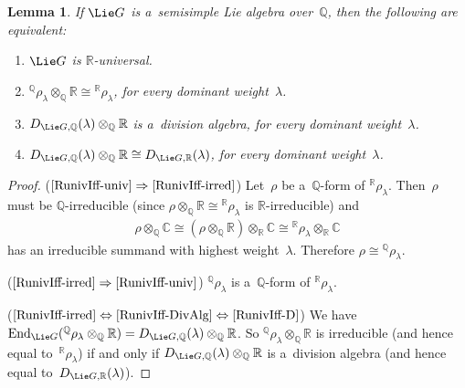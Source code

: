 \documentclass[pdftex]{sigma}
\numberwithin{equation}{section}
\newtheorem{lem}[prop]{Lemma}
{\theoremstyle{definition}
\newtheorem{defn}[prop]{Definition}
\newtheorem{notation}[prop]{Notation}
\newtheorem{rem}[prop]{Remark}
\newtheorem{ques}[prop]{Question}
\newtheorem{eg}[prop]{Example}
\newtheorem{erratum}[prop]{Erratum}}
\begin{document}
\begin{lem}
\label{RunivIff}
If $\Lie G$ is a~semisimple Lie algebra over~$\mathbb{Q}$, then the following are equivalent:
\renewcommand{\labelenumi}{{\rm \theenumi.}}
\begin{enumerate}\itemsep=0pt
\item
\label{RunivIff-univ}
$\Lie G$ is $\mathbb{R}$-universal.
\item
\label{RunivIff-irred}
${}^\mathbb{Q} \rho_\lambda \otimes_\mathbb{Q} \mathbb{R} \cong {}^\mathbb{R} \rho_\lambda$, for every dominant
weight~$\lambda$.
\item
\label{RunivIff-DivAlg}
$D_{\Lie G, \mathbb{Q}}(\lambda) \otimes_\mathbb{Q} \mathbb{R}$ is a~division algebra, for every dominant
weight~$\lambda$.
\item
\label{RunivIff-D}
$D_{\Lie G, \mathbb{Q}}(\lambda) \otimes_\mathbb{Q} \mathbb{R} \cong D_{\Lie G, \mathbb{R}}(\lambda)$, for every
dominant weight~$\lambda$.
\end{enumerate}
\end{lem}

\begin{proof}
($\ref{RunivIff-univ} \Rightarrow \ref{RunivIff-irred}$) Let~$\rho$ be a~$\mathbb{Q}$-form of ${}^\mathbb{R}
\rho_\lambda$.
Then~$\rho$ must be $\mathbb{Q}$-irreducible (since $\rho \otimes_\mathbb{Q} \mathbb{R} \cong {}^\mathbb{R}
\rho_\lambda$ is $\mathbb{R}$-irreducible) and
\begin{gather*}
\rho \otimes_\mathbb{Q} \mathbb{C} \cong (\rho \otimes_\mathbb{Q} \mathbb{R}) \otimes_\mathbb{R} \mathbb{C} \cong
{}^\mathbb{R} \rho_\lambda \otimes_\mathbb{R} \mathbb{C}
\end{gather*}
has an irreducible summand with highest weight~$\lambda$.
Therefore $\rho \cong {}^\mathbb{Q} \rho_\lambda$.

($\ref{RunivIff-irred} \Rightarrow \ref{RunivIff-univ}$) ${}^\mathbb{Q} \rho_\lambda$ is a~$\mathbb{Q}$-form of
${}^\mathbb{R} \rho_\lambda$.

($\ref{RunivIff-irred} \Leftrightarrow \ref{RunivIff-DivAlg} \Leftrightarrow \ref{RunivIff-D}$) We have
$\mathrm{End}_{\Lie G}({}^\mathbb{Q} \rho_\lambda \otimes_\mathbb{Q} \mathbb{R}) = D_{\Lie G, \mathbb{Q}}(\lambda)
\otimes_\mathbb{Q} \mathbb{R}$.
So ${}^\mathbb{Q} \rho_\lambda \otimes_\mathbb{Q} \mathbb{R}$ is irreducible (and hence equal to~${}^\mathbb{R}
\rho_\lambda$) if and only if $D_{\Lie G, \mathbb{Q}}(\lambda) \otimes_\mathbb{Q} \mathbb{R}$ is a~division algebra (and
hence equal to~$D_{\Lie G, \mathbb{R}}(\lambda)$).
\end{proof}
\end{document}
